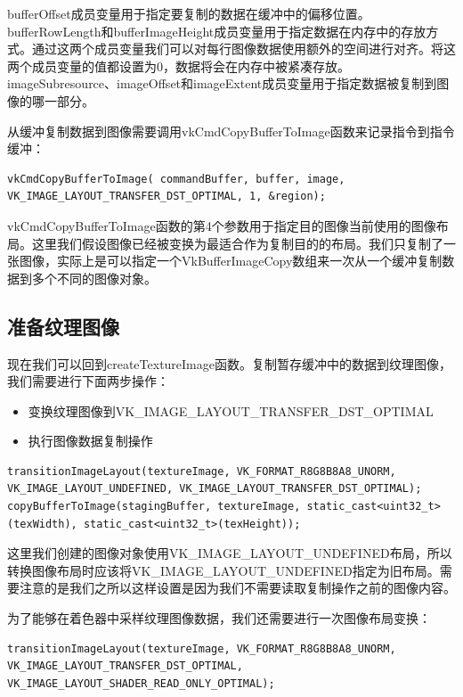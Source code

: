 \documentclass{ctexart}
\begin{document}
bufferOffset成员变量用于指定要复制的数据在缓冲中的偏移位置。bufferRowLength和bufferImageHeight成员变量用于指定数据在内存中的存放方式。通过这两个成员变量我们可以对每行图像数据使用额外的空间进行对齐。将这两个成员变量的值都设置为0，数据将会在内存中被紧凑存放。imageSubresource、imageOffset和imageExtent成员变量用于指定数据被复制到图像的哪一部分。

从缓冲复制数据到图像需要调用vkCmdCopyBufferToImage函数来记录指令到指令缓冲：

\begin{lstlisting}[language={[ANSI]C}]
vkCmdCopyBufferToImage( commandBuffer, buffer, image, VK_IMAGE_LAYOUT_TRANSFER_DST_OPTIMAL, 1, &region);
\end{lstlisting}

vkCmdCopyBufferToImage函数的第4个参数用于指定目的图像当前使用的图像布局。这里我们假设图像已经被变换为最适合作为复制目的的布局。我们只复制了一张图像，实际上是可以指定一个VkBufferImageCopy数组来一次从一个缓冲复制数据到多个不同的图像对象。

\subsection{准备纹理图像}

现在我们可以回到createTextureImage函数。复制暂存缓冲中的数据到纹理图像，我们需要进行下面两步操作：

\begin{itemize}
	\item 变换纹理图像到VK\_IMAGE\_LAYOUT\_TRANSFER\_DST\_OPTIMAL
	\item 执行图像数据复制操作
\end{itemize}

\begin{lstlisting}[language={[ANSI]C}]
transitionImageLayout(textureImage, VK_FORMAT_R8G8B8A8_UNORM, VK_IMAGE_LAYOUT_UNDEFINED, VK_IMAGE_LAYOUT_TRANSFER_DST_OPTIMAL);
copyBufferToImage(stagingBuffer, textureImage, static_cast<uint32_t>(texWidth), static_cast<uint32_t>(texHeight));
\end{lstlisting}

这里我们创建的图像对象使用VK\_IMAGE\_LAYOUT\_UNDEFINED布局，所以转换图像布局时应该将VK\_IMAGE\_LAYOUT\_UNDEFINED指定为旧布局。需要注意的是我们之所以这样设置是因为我们不需要读取复制操作之前的图像内容。

为了能够在着色器中采样纹理图像数据，我们还需要进行一次图像布局变换：

\begin{lstlisting}[language={[ANSI]C}]
transitionImageLayout(textureImage, VK_FORMAT_R8G8B8A8_UNORM, VK_IMAGE_LAYOUT_TRANSFER_DST_OPTIMAL, VK_IMAGE_LAYOUT_SHADER_READ_ONLY_OPTIMAL);
\end{lstlisting}
\end{document}
